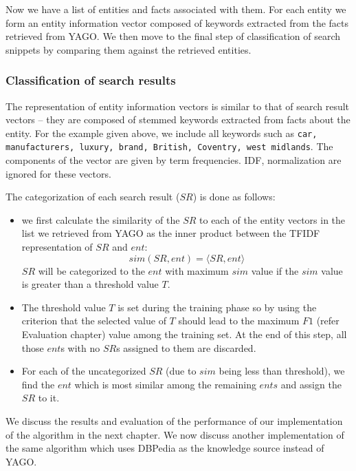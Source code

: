 \documentclass[a4paper,12pt]{report}
\begin{document}
Now we have a list of entities and facts associated with them. For
each entity we form an entity information vector composed of keywords
extracted from the facts retrieved from YAGO. We then move to the
final step of classification of search snippets by comparing them
against the retrieved entities.

\subsubsection{Classification of search results}
The representation of entity information vectors is similar to that of
search result vectors -- they are composed of stemmed keywords
extracted from facts about the entity. For the example given above, we
include all keywords such as {\tt car, manufacturers, luxury, brand,
  British, Coventry, west midlands}. The components of the vector are
given by term frequencies. IDF, normalization are ignored for these
vectors.

The categorization of each search result ($SR$) is done as follows:
\begin{itemize}
   \item we first calculate the similarity of the $SR$ to each of the
     entity vectors in the list we retrieved from YAGO as the inner
     product between the TFIDF representation of $SR$ and $ent$:
     $$ sim(SR, ent) =  \langle SR, ent \rangle $$
     $SR$ will be categorized to the $ent$ with maximum $sim$ value if
     the $sim$ value is greater than a threshold value $T$.
    \item The threshold value $T$ is set during the training phase so
      by using the criterion that the selected value of $T$ should
      lead to the maximum $F1$ (refer Evaluation chapter) value among
      the training set. At the end of this step, all those $ent$s
      with no $SR$s assigned to them are discarded.
     \item For each of the uncategorized $SR$ (due to $sim$ being less
       than threshold), we find the $ent$ which is most similar among
       the remaining $ents$ and assign the $SR$ to it.
\end{itemize}

We discuss the results and evaluation of the performance of our
implementation of the algorithm in the next chapter. We now
discuss another implementation of the same algorithm which uses
DBPedia as the knowledge source instead of YAGO.
\end{document}
